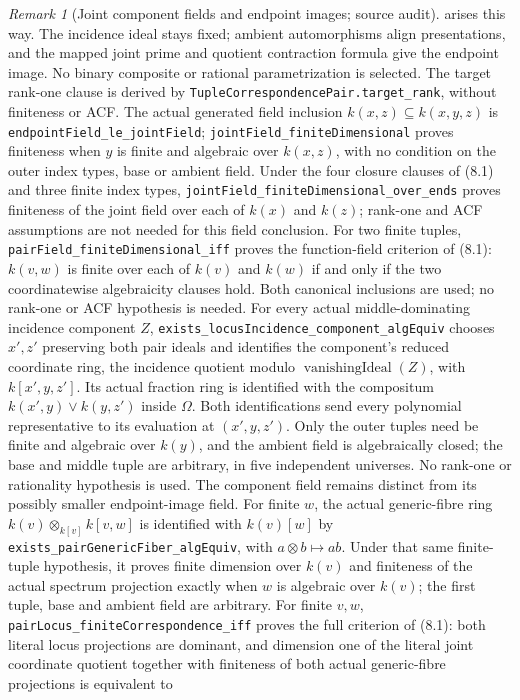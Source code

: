 \documentclass[11pt,oneside]{article}
\theoremstyle{definition}
\theoremstyle{remark}
\newtheorem{remark}[theorem]{Remark}
\newcommand{\lean}[1]{\nolinkurl{#1}}
\begin{document}
\begin{remark}[Joint component fields and endpoint images; source audit]
arises this way. The incidence ideal stays fixed; ambient automorphisms
align presentations, and the mapped joint prime and quotient contraction
formula give the endpoint image. No binary composite or rational
parametrization is selected. The target rank-one clause is derived by
\lean{TupleCorrespondencePair.target_rank}, without finiteness or ACF.
The actual generated field inclusion $k(x,z)\subseteq k(x,y,z)$ is
\lean{endpointField_le_jointField}; \lean{jointField_finiteDimensional}
proves finiteness when $y$ is finite and algebraic over $k(x,z)$, with no
condition on the outer index types, base or ambient field. Under the four
closure clauses of (8.1) and three finite index types,
\lean{jointField_finiteDimensional_over_ends} proves finiteness of the joint
field over each of $k(x)$ and $k(z)$; rank-one and ACF assumptions are not
needed for this field conclusion. For two finite tuples,
\lean{pairField_finiteDimensional_iff} proves the function-field criterion of
(8.1): $k(v,w)$ is finite over each of $k(v)$ and $k(w)$ if and only if the
two coordinatewise algebraicity clauses hold. Both canonical inclusions
are used; no rank-one or ACF hypothesis is needed. For every actual middle-dominating incidence component $Z$,
\lean{exists_locusIncidence_component_algEquiv} chooses $x',z'$ preserving
both pair ideals and identifies the component's reduced coordinate ring,
the incidence quotient modulo $\operatorname{vanishingIdeal}(Z)$, with
$k[x',y,z']$. Its actual fraction ring is identified with the compositum
$k(x',y)\vee k(y,z')$ inside $\Omega$. Both identifications send every
polynomial representative to its evaluation at $(x',y,z')$.
Only the outer tuples need be finite and algebraic over $k(y)$, and the
ambient field is algebraically closed; the base and middle tuple are
arbitrary, in five independent universes. No rank-one or rationality
hypothesis is used. The component field remains distinct from its
possibly smaller endpoint-image field.
For finite $w$, the actual generic-fibre ring
$k(v)\otimes_{k[v]} k[v,w]$ is identified with $k(v)[w]$ by
\lean{exists_pairGenericFiber_algEquiv}, with $a\otimes b\mapsto ab$.
Under that same finite-tuple hypothesis, it proves finite dimension over
$k(v)$ and finiteness of
the actual spectrum projection exactly when $w$ is algebraic over $k(v)$;
the first tuple, base and ambient field are arbitrary.
For finite $v,w$, \lean{pairLocus_finiteCorrespondence_iff} proves the
full criterion of (8.1): both literal locus projections are dominant,
and dimension one of the literal joint coordinate quotient together with
finiteness of both actual generic-fibre projections is equivalent to

\end{remark}
\end{document}
